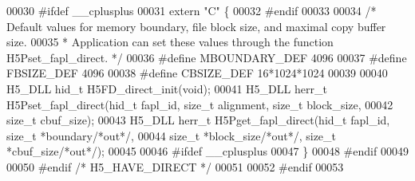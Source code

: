 \begin{DoxyCode}
00030 \textcolor{preprocessor}{#ifdef \_\_cplusplus}
00031 \textcolor{keyword}{extern} \textcolor{stringliteral}{"C"} \{
00032 \textcolor{preprocessor}{#endif}
00033 
00034 \textcolor{comment}{/* Default values for memory boundary, file block size, and maximal copy buffer size.}
00035 \textcolor{comment}{ * Application can set these values through the function H5Pset\_fapl\_direct. */}
00036 \textcolor{preprocessor}{#define MBOUNDARY\_DEF       4096}
00037 \textcolor{preprocessor}{#define FBSIZE\_DEF      4096}
00038 \textcolor{preprocessor}{#define CBSIZE\_DEF      16*1024*1024}
00039 
00040 H5\_DLL hid\_t H5FD\_direct\_init(\textcolor{keywordtype}{void});
00041 H5\_DLL herr\_t H5Pset\_fapl\_direct(hid\_t fapl\_id, \textcolor{keywordtype}{size\_t} alignment, \textcolor{keywordtype}{size\_t} block\_size,
00042             \textcolor{keywordtype}{size\_t} cbuf\_size);
00043 H5\_DLL herr\_t H5Pget\_fapl\_direct(hid\_t fapl\_id, \textcolor{keywordtype}{size\_t} *boundary\textcolor{comment}{/*out*/},
00044             \textcolor{keywordtype}{size\_t} *block\_size\textcolor{comment}{/*out*/}, \textcolor{keywordtype}{size\_t} *cbuf\_size\textcolor{comment}{/*out*/});
00045 
00046 \textcolor{preprocessor}{#ifdef \_\_cplusplus}
00047 \}
00048 \textcolor{preprocessor}{#endif}
00049 
00050 \textcolor{preprocessor}{#endif }\textcolor{comment}{/* H5\_HAVE\_DIRECT */}\textcolor{preprocessor}{}
00051 
00052 \textcolor{preprocessor}{#endif}
00053 
\end{DoxyCode}
